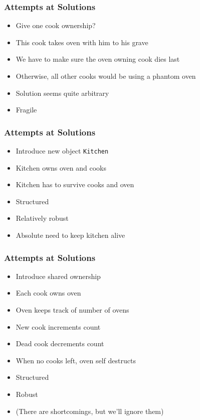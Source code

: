 \documentclass{../ucll-slides}
\begin{document}
\begin{frame}
  \frametitle{Attempts at Solutions}
  \begin{itemize}
    \item Give one cook ownership?
    \item This cook takes oven with him to his grave
    \item We have to make sure the oven owning cook dies last
    \item Otherwise, all other cooks would be using a phantom oven
  \end{itemize}
  \vskip5mm
  \begin{itemize}
    \item Solution seems quite arbitrary
    \item Fragile
  \end{itemize}
\end{frame}

\begin{frame}
  \frametitle{Attempts at Solutions}
  \begin{itemize}
    \item Introduce new object {\tt Kitchen}
    \item Kitchen owns oven and cooks
    \item Kitchen has to survive cooks and oven
  \end{itemize}
  \vskip5mm
  \begin{itemize}
    \item Structured
    \item Relatively robust
    \item Absolute need to keep kitchen alive
  \end{itemize}
\end{frame}

\begin{frame}
  \frametitle{Attempts at Solutions}
  \begin{itemize}
    \item Introduce shared ownership
    \item Each cook owns oven
    \item Oven keeps track of number of ovens
    \item New cook increments count
    \item Dead cook decrements count
    \item When no cooks left, oven self destructs
  \end{itemize}
  \vskip5mm
  \begin{itemize}
    \item Structured
    \item Robust
    \item (There are shortcomings, but we'll ignore them)
  \end{itemize}
\end{frame}
\end{document}
